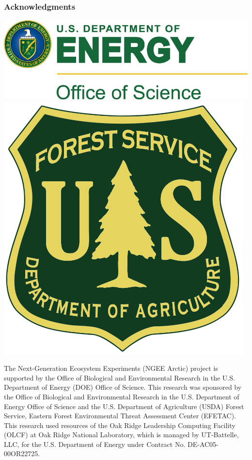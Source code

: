 \begin{frame}
 \frametitle{Acknowledgments}\footnotesize
 \begin{center}
  \vskip-0.25in
  \includegraphics[height=0.20\textheight]{logos/DOE_Office_of_Science_logo.pdf}
  \hskip0.50in
    \includegraphics[height=0.20\textheight]{logos/USFS_Logo.png}
 \end{center}
 \vbox{\small The Next-Generation Ecosystem Experiments (NGEE Arctic) project is
 supported by the Office of Biological and Environmental Research
 in the U.S. Department of Energy (DOE) Office of Science.
 This research was sponsored by the Office of Biological and Environmental
 Research in the U.S. Department of Energy Office of Science and the
 U.S. Department of Agriculture (USDA) Forest Service, Eastern Forest
 Environmental Threat Assessment Center (EFETAC).
 This research used resources of the Oak Ridge Leadership Computing
 Facility (OLCF) at Oak Ridge National Laboratory, which is managed by
 UT-Battelle, LLC, for the U.S. Department of Energy under Contract
 No. DE-AC05-00OR22725.}
\end{frame}
